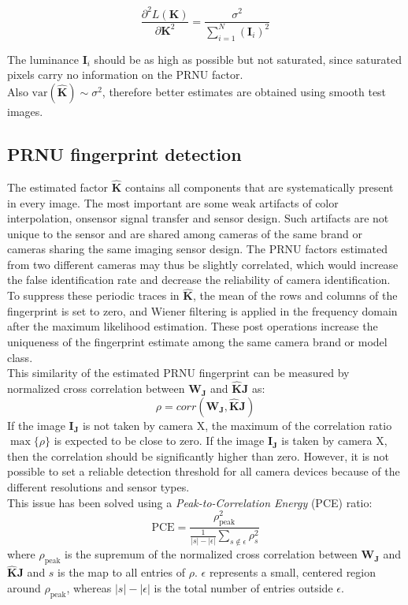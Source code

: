 \documentclass[a4paper, 12pt]{article}
\begin{document}
\begin{equation}
\dfrac{ \partial^2 L(\mathbf{K})}{\partial \mathbf{K}^2} = \dfrac{\sigma^2}{\sum\limits_{i=1}^{N} \left( \mathbf{I}_i \right) ^2}
\end{equation}

The luminance $\mathbf{I}_i$ should be as high as possible but not saturated, since saturated pixels carry no information on the PRNU factor.\\
Also $\text{var}(\mathbf{\hat{K}}) \sim \sigma^2$, therefore better estimates are obtained using smooth test images.

\subsection*{PRNU fingerprint detection}

The estimated factor $\mathbf{\hat{K}}$ contains all components that are systematically present in every image. The most important are some weak artifacts of color interpolation, onsensor signal transfer and sensor design. Such artifacts are not unique to the sensor and are shared among cameras of the same brand or cameras sharing the same imaging sensor design. The PRNU factors estimated from two different cameras may thus be slightly correlated, which would increase the false identification rate and decrease the reliability of camera identification.\\
To suppress these periodic traces in $\mathbf{\hat{K}}$, the mean of the rows and columns of the fingerprint is set to zero, and Wiener filtering is applied in the frequency domain after the maximum likelihood estimation. These post operations increase the uniqueness of the fingerprint estimate among the same camera brand or model class.\\
This similarity of the estimated PRNU fingerprint can be measured by normalized cross correlation between $\mathbf{W_J}$ and $\mathbf{\hat{K}J}$ as:
\begin{equation}
\rho = corr \left( \mathbf{W_J}, \mathbf{\hat{K}J} \right)
\end{equation}
If the image $\mathbf{I_J}$ is not taken by camera X, the maximum of the correlation ratio $\max\{\rho\}$ is expected to be close to zero. If the image $\mathbf{I_J}$ is taken by camera X, then the correlation should be significantly higher than zero. However, it is not possible to set a reliable detection threshold for all camera devices because of the different resolutions and sensor types.\\
This issue has been solved using a \textit{Peak-to-Correlation Energy} (PCE) ratio:
\begin{equation}
\text{PCE} = \dfrac{{\rho}^2_{\text{peak}}}{\frac{1}{|s|-|\epsilon|} \sum\limits_{s\notin \epsilon} {\rho}^2_s}
\end{equation}
where ${\rho}_{\text{peak}}$ is the supremum of the normalized cross correlation between $\mathbf{W_J}$ and $\mathbf{\hat{K}J}$ and $s$ is the map to all entries of $\rho$. $\epsilon$ represents a small, centered region around ${\rho}_{\text{peak}}$, whereas $|s|-|\epsilon|$ is the total number of entries outside $\epsilon$.
\clearpage
\end{document}
